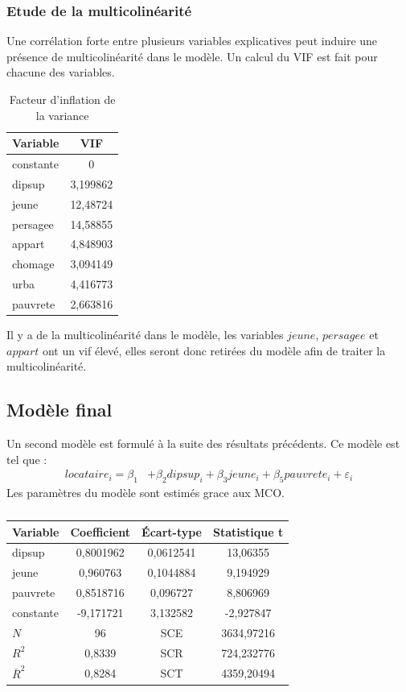 \documentclass{article}
\begin{document}
\subsubsection{Etude de la multicolinéarité}
Une corrélation forte entre plusieurs variables explicatives peut induire une présence de multicolinéarité dans le modèle. Un calcul du VIF est fait pour chacune des variables.
\begin{table}[H]
\centering
\caption{Facteur d'inflation de la variance}
\begin{tabular}{l*{1}{c}}
\toprule
Variable            &         VIF\\
\midrule
constante & 0 \\
dipsup&    3,199862\\
jeune  &    12,48724\\
persagee	   &    14,58855\\
appart&    4,848903\\
chomage&    3,094149\\
urba   &    4,416773\\
pauvrete&    2,663816\\
\bottomrule
\end{tabular}
\end{table}
Il y a de la multicolinéarité dans le modèle, les variables $jeune$, $persagee$ et $appart$ ont un vif
élevé, elles seront donc retirées du modèle afin de traiter la multicolinéarité.
\subsection{Modèle final}
Un second modèle est formulé à la suite des résultats précédents. Ce modèle est tel que :
\begin{equation*}
    \begin{split}
            locataire_i =  \beta_1 &+ \beta_2dipsup_i + \beta_3jeune_i + \beta_5pauvrete_i + \varepsilon_i 
    \end{split}
\end{equation*}
Les paramètres du modèle sont estimés grace aux MCO.
\begin{table}[H]
\centering
\caption{}
\label{table:secondeReg}
\begin{tabular}{l*{1}{ccc}}
\toprule
Variable            & Coefficient&  Écart-type&Statistique t\\
\midrule
dipsup&    0,8001962&    0,0612541&    13,06355\\
jeune  &     0,960763&    0,1044884&    9,194929\\
pauvrete&    0,8518716&     0,096727&    8,806969\\
constante      &   -9,171721&    3,132582&   -2,927847\\
\midrule
$N$       &          96& SCE           &   3634,97216           \\
$R^{2}$ & 0,8339 & SCR & 724,232776   \\ 
$\bar{R}^2$ & 0,8284 & SCT & 4359,20494\\ 
\bottomrule
\end{tabular}
\end{table}
\end{document}

